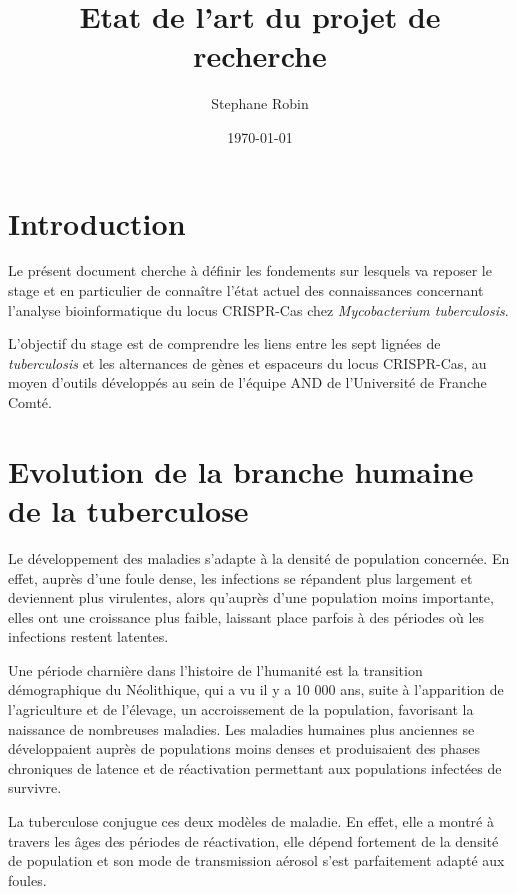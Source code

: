 \documentclass[twoside,a4paper,11pt,frenchb,openany]{report}
\title{Etat de l'art du projet de recherche}
\author{Stephane Robin}
\date{\today}
\begin{document}
\maketitle

\section{Introduction}

Le présent document cherche à définir les fondements sur lesquels va reposer le stage et en particulier de connaître l'état actuel des connaissances concernant l'analyse bioinformatique du locus CRISPR-Cas chez \textit{Mycobacterium tuberculosis}.

L'objectif du stage est de comprendre les liens entre les sept lignées de \textit{tuberculosis} et les alternances de gènes et espaceurs du locus CRISPR-Cas, au moyen d'outils développés au sein de l'équipe AND de l'Université de Franche Comté.


\section{Evolution de la branche humaine de la tuberculose}

Le développement des maladies s'adapte à la densité de population concernée. En effet, auprès d'une foule dense, les infections se répandent plus largement et deviennent plus virulentes, alors qu'auprès d'une population moins importante, elles ont une croissance plus faible, laissant place parfois à des périodes où les infections restent latentes.

Une période charnière dans l'histoire de l'humanité est la transition démographique du Néolithique, qui a vu il y a 10 000 ans, suite à l'apparition de l'agriculture et de l'élevage, un accroissement de la population, favorisant la naissance de nombreuses maladies. Les maladies humaines plus anciennes se développaient auprès de populations moins denses et produisaient des phases chroniques de latence et de réactivation permettant aux populations infectées de survivre.

La tuberculose conjugue ces deux modèles de maladie. En effet, elle a montré à travers les âges des périodes de réactivation, elle dépend fortement de la densité de population et son mode de transmission aérosol s'est parfaitement adapté aux foules.

\end{document}
